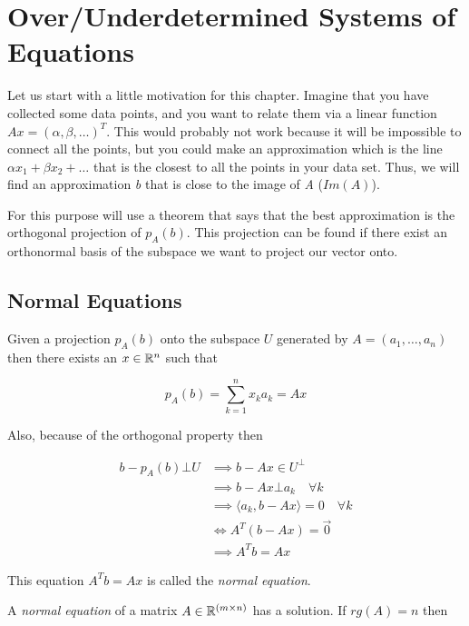\newpage
\section{Over/Underdetermined Systems of Equations}

Let us start with a little motivation for this chapter. Imagine that you have collected some data points, 
and you want to relate them via a linear function \(Ax = (\alpha, \beta, \dots)^T\). This would probably 
not work because it will be impossible to connect all the points, but you could make an approximation 
which is the line \(\alpha x_1 + \beta x_2 + \dots\) that is the closest to all the points in your data 
set. Thus, we will find an approximation 
\emph{b} that is close to the image of \emph{A} (\(Im(A)\)).
\vspace{\baselineskip}

For this purpose will use a theorem that says that the best approximation is the orthogonal projection of 
\(p_A (b)\). This projection can be found if there exist an orthonormal basis of the subspace we want to 
project our vector onto.

\subsection{Normal Equations}

Given a projection \(p_A (b)\) onto the subspace \(U\) generated by \(A = (a_1, \dots, a_n)\) then there 
exists an \(x \in \mathbb{R}^n\) such that 

\[
	p_{A}(b) = \sum_{k = 1}^{n} x_k a_k = Ax
\]

Also, because of the orthogonal property then

\begin{align*}
	b - p_{A}(b) \bot U &\implies b - Ax  \in U^{\bot}\\
						&\implies b - Ax \bot a_k \quad \forall k\\
						&\implies \langle a_k, b - Ax \rangle = 0 \quad \forall k\\
						&\iff A^{T} (b - Ax) = \vec{0}\\
						&\implies A^{T}b = Ax 
\end{align*}

This equation \(A^{T}b = Ax\) is called the \emph{normal equation}.
\vspace{\baselineskip}

A \emph{normal equation} of a matrix \(A \in \mathbb{R}^{(m \times n)}\) has a solution. 
If \(rg(A) = n\) then 

